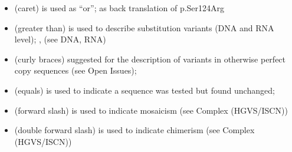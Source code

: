 \begin{itemize}
	\item \myDoubleQuoteEnglish{ \^ } (caret) is used as “or”;  as back translation of p.Ser124Arg
	
	\item \myDoubleQuoteEnglish{>} (greater than) is used to describe substitution variants (DNA and RNA level); ,  (see DNA, RNA)
	
	\item \myDoubleQuoteEnglish{\{ \}} (curly braces) suggested for the description of variants in otherwise perfect copy sequences (see Open Issues); 
	
	\item \myDoubleQuoteEnglish{=} (equals) is used to indicate a sequence was tested but found unchanged; 
	
	\item \myDoubleQuoteEnglish{/} (forward slash) is used to indicate mosaicism (see Complex (HGVS/ISCN))
	
	\item \myDoubleQuoteEnglish{//} (double forward slash) is used to indicate chimerism (see Complex (HGVS/ISCN))
\end{itemize}